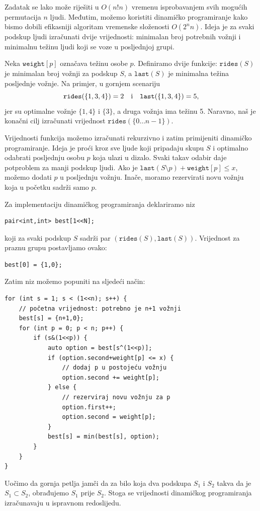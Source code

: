 Zadatak se lako može riješiti u $O(n! n)$ vremenu
isprobavanjem svih mogućih permutacija $n$ ljudi.
Međutim, možemo koristiti dinamičko programiranje kako bismo dobili
efikasniji algoritam vremenske složenosti $O(2^n n)$.
Ideja je za svaki podskup ljudi izračunati
dvije vrijednosti: minimalan broj potrebnih vožnji i
minimalnu težinu ljudi koji se voze u posljednjoj grupi.

Neka $\texttt{weight}[p]$ označava težinu
osobe $p$.
Definiramo dvije funkcije:
$\texttt{rides}(S)$ je minimalan broj
vožnji za podskup $S$,
a $\texttt{last}(S)$ je minimalna težina
posljednje vožnje.
Na primjer, u gornjem scenariju
\[ \texttt{rides}(\{1,3,4\})=2 \hspace{10px} \textrm{i}
\hspace{10px} \texttt{last}(\{1,3,4\})=5,\]
jer su optimalne vožnje $\{1,4\}$ i $\{3\}$,
a druga vožnja ima težinu 5.
Naravno, naš je konačni cilj izračunati vrijednost
$\texttt{rides}(\{0 \ldots n-1\})$.

Vrijednosti funkcija možemo izračunati
rekurzivno i zatim primijeniti
dinamičko programiranje.
Ideja je proći kroz sve ljude
koji pripadaju skupu $S$ i optimalno
odabrati posljednju osobu $p$ koja ulazi u dizalo.
Svaki takav odabir daje potproblem
za manji podskup ljudi.
Ako je $\texttt{last}(S \setminus p)+\texttt{weight}[p] \le x$,
možemo dodati $p$ u posljednju vožnju.
Inače, moramo rezervirati novu vožnju
koja u početku sadrži samo $p$.

Za implementaciju dinamičkog programiranja
deklariramo niz
\begin{lstlisting}
pair<int,int> best[1<<N];
\end{lstlisting}
koji za svaki podskup $S$ sadrži
par $(\texttt{rides}(S),\texttt{last}(S))$.
Vrijednost za praznu grupu postavljamo ovako:
\begin{lstlisting}
best[0] = {1,0};
\end{lstlisting}
Zatim niz možemo popuniti na sljedeći način:

\begin{lstlisting}
for (int s = 1; s < (1<<n); s++) {
    // početna vrijednost: potrebno je n+1 vožnji
    best[s] = {n+1,0};
    for (int p = 0; p < n; p++) {
        if (s&(1<<p)) {
            auto option = best[s^(1<<p)];
            if (option.second+weight[p] <= x) {
                // dodaj p u postojeću vožnju
                option.second += weight[p];
            } else {
                // rezerviraj novu vožnju za p
                option.first++;
                option.second = weight[p];
            }
            best[s] = min(best[s], option);
        }
    }
}
\end{lstlisting}
Uočimo da gornja petlja jamči da
za bilo koja dva podskupa $S_1$ i $S_2$
takva da je $S_1 \subset S_2$, obrađujemo $S_1$ prije $S_2$.
Stoga se vrijednosti dinamičkog programiranja izračunavaju u
ispravnom redoslijedu.

